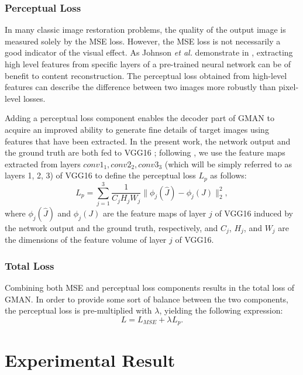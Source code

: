 \documentclass[journal]{IEEEtran}
\begin{document}
\subsubsection{Perceptual Loss}

In many classic image restoration problems, the quality of the output image is measured solely by the MSE loss. However, the MSE loss is not necessarily a good indicator of the visual effect. As Johnson \textit{et al.} demonstrate in \cite{johnson2016perceptual}, extracting high level features from specific layers of a pre-trained neural network can be of benefit to content reconstruction. The perceptual loss obtained from high-level features can describe the difference between two images more robustly than pixel-level losses.

Adding a perceptual loss component enables the decoder part of GMAN to acquire an improved ability to generate fine details of target images using features that have been extracted. In the present work, the network output and the ground truth are both fed to VGG16 \cite{VGG16}; following \cite{johnson2016perceptual}, we use the feature maps extracted from layers \textit{$conv1_1, conv2_2, conv3_3$} (which will be simply referred to as layers 1, 2, 3) of VGG16 to define the perceptual loss $L_{p}$ as follows:
\begin{equation}\label{perceptual loss}
L_{p}=\sum\limits_{j=1}^3\frac{1}{C_{j}H_{j}W_{j}}\parallel\phi_{j}(\hat{J})-\phi_{j}(J)\parallel^{2}_{2},
\end{equation}
where $\phi_j(\hat J)$ and $\phi_j(J)$ are the feature maps of  layer $j$ of VGG16 induced by the network output and the ground truth, respectively, and $C_j$, $H_j$, and $W_j$ are the dimensions of the feature volume of layer $j$ of VGG16.
 



\subsubsection{Total Loss}
Combining both MSE and perceptual loss components results in the total loss of GMAN. In order to provide some sort of balance between the two components, the perceptual loss is pre-multiplied with $\lambda$, yielding the following expression:
\begin{equation}\label{loss}
L=L_{MSE}+\lambda_{}L_{p}.
\end{equation}


\section{Experimental Result}
\end{document}
